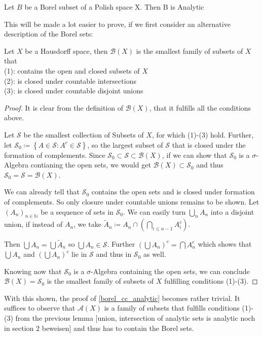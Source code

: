 \documentclass[10pt, a4paper, titlepage]{article}
\numberwithin{equation}{section}
\begin{document}
\begin{theorem}
	\label{borel_cc_analytic}
	Let $B$ be a Borel subset of a Polish space X. Then B is Analytic		
\end{theorem}
This will be made a lot easier to prove, if we first
consider an alternative description of the Borel sets:
\begin{lemma}
	Let $X$ be a Hausdorff space, then
	$\mathcal{B}\left( X \right) $ is the smallest
	family of subsets of $X$ that\\
	(1): contains the open and closed subsets of  $X$\\
	(2): is closed under countable intersections\\
	(3): is closed under countable disjoint unions
\end{lemma}
\begin{proof}
	It is clear from the definition of
	$\mathcal{B}\left( X \right) $, that it fulfills all
	the conditions above. 

	Let $\mathscr{S}$ be the smallest collection of
	Subsets of $X$, for which (1)-(3) hold. 
	Further, let  $\mathscr{S}_0 \coloneq \left\{ A \in
	\mathscr{S}: A^c \in \mathscr{S} \right\} $, so the
	largest subset of $\mathscr{S}$ that is closed under
	the formation of complements. 
	Since $\mathscr{S}_0 \subset \mathscr{S} \subset
	\mathcal{B}(X)$, if we can show that $\mathscr{S}_0$ 
	is a $\sigma$-Algebra contianing the open sets, we
	would get  $\mathcal{B}\left( X \right) \subset
	\mathscr{S}_0 $ and thus $\mathscr{S}_0 =
	\mathscr{S} = \mathcal{B}\left(X \right) $.

	We can already tell that  $\mathscr{S}_0$ contains
	the open sets and is closed under formation of
	complements. 
	So only closure under countable unions remains to be
	shown.
	Let $\left( A_n \right)_{n \in  \mathbb{N}}$ be a
	sequence of sets in $\mathscr{S}_0$.
	We can easily turn  $\bigcup_n A_n $ into a disjoint
	union, if instead of  $A_n$, we take  $\tilde{A}_n
	\coloneq  A_n \cap
	(\bigcap_{i \leq n-1} A_i^c)$.

	Then $\bigcup A_n  = \bigcup \tilde{A}_n$ so  $\bigcup A_n \in \mathscr{S}$.
	Further $\left( \bigcup A_n \right)^c = \bigcap
	A_n^c $ which shows that $\bigcup A_n $ and $\left(
	\bigcup A_n \right) ^c$ lie in $\mathscr{S}$ and
	thus in  $\mathscr{S}_0$ as well. 
	
	Knowing now that $\mathscr{S}_0$ is a
	$\sigma$-Algebra containing the open sets, we can
	conclude
	$\mathcal{B}\left( X \right) = \mathscr{S}_0$ is the
	smallest family of subsets of $X$ fulfilling
	conditions (1)-(3).
\end{proof}
With this shown, the proof of \autoref{borel_cc_analytic}
becomes rather trivial. It suffices to observe that
$\mathcal{A}\left( X \right)$ is a family of subsets that
fulfills conditions (1)-(3) from the previous lemma [union,
intersection of analytic sets is analytic noch in section 2
beweisen] and thus
has to contain the Borel sets.
\end{document}
